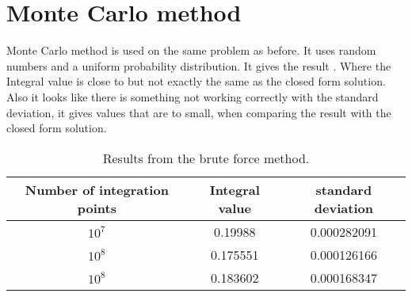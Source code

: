 \section{Monte Carlo method}
Monte Carlo method is used on the same problem as before. It uses random numbers and a uniform probability distribution. It gives the result . Where the Integral value is close to but not exactly the same as the closed form solution. Also it looks like there is something not working correctly with the standard deviation, it gives values that are to small, when comparing the result with the closed form solution. 

\begin{table}[ht]
\centering
\caption{Results from the brute force method.}
\begin{center}
\begin{tabular}{c|c|c}

Number of integration points & Integral value & standard deviation \\
\hline
$10^7$ & 0.19988 & 0.000282091 \\
$10^8$ & 0.175551  & 0.000126166 \\
$10^8$ & 0.183602  & 0.000168347\\

\end{tabular}
\end{center}
\label{tab:BFM}
\end{table}

